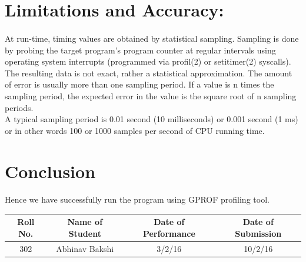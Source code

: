 \documentclass[a4paper,12pt]{article}
\begin{document}
\begin{itemize}
\section{Limitations and Accuracy:}
   	\paragraph{} 
   	\begin{itemize}
   		At run-time, timing values are obtained by statistical sampling. Sampling is done by probing the target program's program counter at regular intervals using operating system interrupts (programmed via profil(2) or setitimer(2) syscalls).\\
   		The resulting data is not exact, rather a statistical approximation. The amount of error is usually more than one sampling period. If a value is n times the sampling period, the expected error in the value is the square root of n sampling periods.\\
   		A typical sampling period is 0.01 second (10 milliseconds) or 0.001 second (1 ms) or in other words 100 or 1000 samples per second of CPU running time.\\
   	\end{itemize}
\section{Conclusion}
	\paragraph{} Hence we have successfully run the program using GPROF profiling tool.
\vspace{20px}
\begin{center}
	\begin{tabular}
		{|c|c|c|c|}\hline
		{\bf Roll No.}		&{\bf Name of Student}		&{\bf Date of Performance}  				&{\bf Date of Submission}  \\ \hline
		{302}	&	{Abhinav Bakshi}& {3/2/16}	&  {10/2/16}\\ \hline
	\end{tabular}\\ 
\end{center}



\end{itemize}
\end{document}
